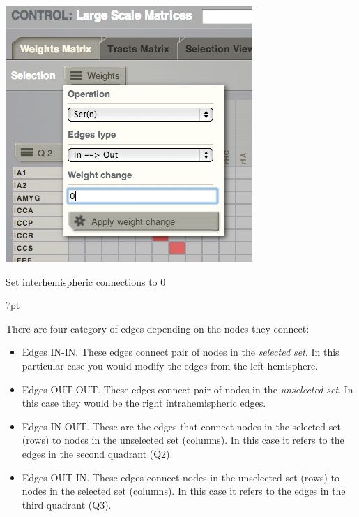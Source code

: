 \documentclass{tufte-handout}
\newenvironment{blah}{%
  \def\FrameCommand{%
    \hspace{1pt}%
    {\color{DarkOrange}\vrule width 2pt}%
    {\color{PeachPuff}\vrule width 4pt}%
    \colorbox{PeachPuff}%
  }%
  \MakeFramed{\advance\hsize-\width\FrameRestore}%
  \noindent\hspace{-4.55pt}%
  \begin{adjustwidth}{}{7pt}%
  \vspace{2pt}\vspace{2pt}%
}
{%
  \vspace{2pt}\end{adjustwidth}\endMakeFramed%
}
\begin{document}
\begin{marginfigure}
  \includegraphics[width=\linewidth]{Handout_UI_ModellingStructuralLesions_EdgeOperations}%
  \caption{Set interhemispheric connections to 0}%
  \label{fig:steps_05_06}%
\end{marginfigure}


\begin{blah}
There are four category of edges depending on the nodes they connect:
\begin{itemize}
  \item Edges IN-IN. These edges connect pair of nodes in the \textit{selected set}. In this
  particular case you would modify the edges from the left hemisphere.
  \item Edges OUT-OUT. These edges connect pair of nodes in the \textit{unselected
  set}. In this case they would be the right intrahemispheric edges.
  \item Edges IN-OUT. These are the edges that connect nodes in the selected set
  (rows) to nodes in the unselected set (columns). In this case it refers to
  the edges in the second quadrant (Q2).
  \item Edges OUT-IN. These edges connect nodes in the unselected set (rows) to
  nodes in the selected set (columns). In this case it refers to the edges in the third
  quadrant (Q3).
\end{itemize}
\end{blah}
\end{document}
